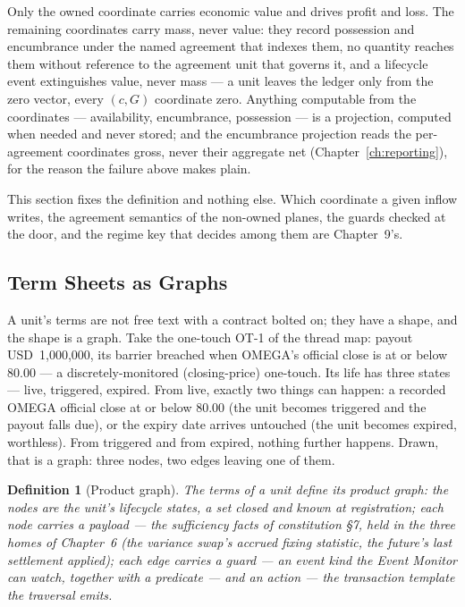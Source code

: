 \documentclass[11pt,a4paper]{article}
\newcommand{\USD}[1]{\mbox{USD~#1}}
\newtheorem{definition}{Definition}[section]
\begin{document}
Only the owned coordinate carries economic value and drives profit and loss. The remaining
coordinates carry mass, never value: they record possession and encumbrance under the
named agreement that indexes them, no quantity reaches them without reference to the
agreement unit that governs it, and a lifecycle event extinguishes value, never mass ---
a unit leaves the ledger only from the zero vector, every $(c,G)$ coordinate zero. Anything
computable from the coordinates --- availability, encumbrance, possession --- is a
projection, computed when needed and never stored; and the encumbrance projection reads
the per-agreement coordinates gross, never their aggregate net
(Chapter~\ref{ch:reporting}), for the reason the failure above makes plain.

This section fixes the definition and nothing else. Which coordinate a given inflow
writes, the agreement semantics of the non-owned planes, the guards checked at the door,
and the regime key that decides among them are Chapter~9's.

\subsection{Term Sheets as Graphs}\label{sec:termsheet-graphs}

A unit's terms are not free text with a contract bolted on; they have a shape, and the
shape is a graph. Take the one-touch OT-1 of the thread map: payout \USD{1{,}000{,}000},
its barrier breached when OMEGA's official close is at or below 80.00 --- a
discretely-monitored (closing-price) one-touch. Its life has three states --- live,
triggered, expired. From live, exactly two things can happen: a recorded OMEGA official
close at or below 80.00 (the unit becomes triggered and the payout falls due), or the
expiry date arrives untouched (the unit becomes expired, worthless). From triggered and
from expired, nothing further happens. Drawn, that is a graph: three nodes, two edges
leaving one of them.

\begin{definition}[Product graph]\label{def:product-graph}
The terms of a unit define its \emph{product graph}: the nodes are the unit's lifecycle
states, a set closed and known at registration; each node carries a payload --- the
sufficiency facts of constitution \S 7, held in the three homes of Chapter~6 (the
variance swap's accrued fixing statistic, the future's last settlement applied); each
edge carries a \emph{guard} --- an event kind the Event Monitor can watch, together with
a predicate --- and an \emph{action} --- the transaction template the traversal emits.
\end{definition}
\end{document}
